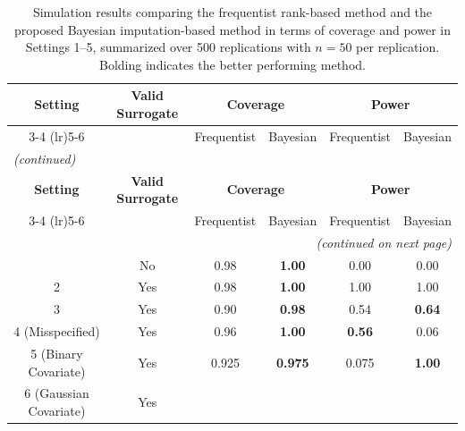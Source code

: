 \documentclass[12pt]{article}
\begin{document}
\begin{longtable}[]{@{}cccccc@{}}
\caption{Simulation results comparing the frequentist rank-based method and the proposed 
Bayesian imputation-based method in terms of coverage and power in Settings 1--5, summarized 
over 500 replications with $n=50$ per replication. Bolding indicates the better performing method.}
\label{tab:coverage_power_comparison} \\
\toprule
\textbf{Setting} & \textbf{Valid Surrogate} & \multicolumn{2}{c}{\textbf{Coverage}} & \multicolumn{2}{c}{\textbf{Power}} \\
\cmidrule(lr){3-4} \cmidrule(lr){5-6}
& & Frequentist & Bayesian & Frequentist & Bayesian \\
\midrule
\endfirsthead
\multicolumn{6}{l}{\textit{(continued)}} \\
\toprule
\textbf{Setting} & \textbf{Valid Surrogate} & \multicolumn{2}{c}{\textbf{Coverage}} & \multicolumn{2}{c}{\textbf{Power}} \\
\cmidrule(lr){3-4} \cmidrule(lr){5-6}
& & Frequentist & Bayesian & Frequentist & Bayesian \\
\midrule
\endhead
\midrule
\multicolumn{6}{r}{\textit{(continued on next page)}} \\
\endfoot
\bottomrule
\endlastfoot
1  & No & 0.98 & \textbf{1.00} & 0.00 & 0.00 \\
2  & Yes & 0.98 & \textbf{1.00} & 1.00 & 1.00 \\
3 & Yes & 0.90 & \textbf{0.98} & 0.54 & \textbf{0.64} \\
4 (Misspecified) & Yes & 0.96 & \textbf{1.00} & \textbf{0.56} & 0.06 \\
5 (Binary Covariate) & Yes & 0.925 & \textbf{0.975} & 0.075 & \textbf{1.00} \\
6 (Gaussian Covariate) & Yes & & & & \\
\end{longtable}

\vspace{3em}
\clearpage
\end{document}
